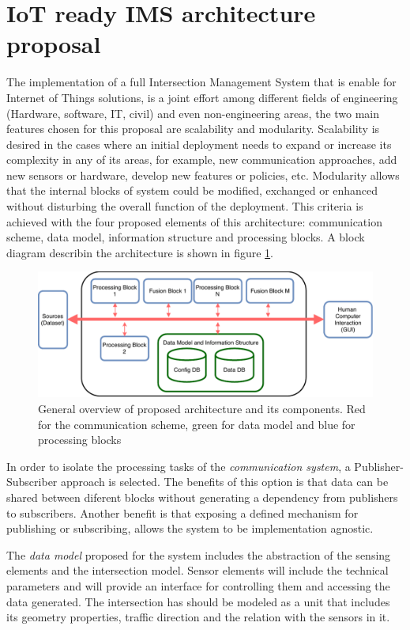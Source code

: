 \documentclass[conference]{IEEEtran}
\begin{document}
\section{IoT ready IMS architecture proposal}

The implementation of a full Intersection Management System that is enable for Internet of Things solutions, is a joint effort among different fields of engineering (Hardware, software, IT, civil) and even non-engineering areas, the two main features chosen for this proposal are scalability and modularity. Scalability is desired in the cases where an initial deployment needs to expand or increase its complexity in any of its areas, for example, new communication approaches, add new sensors or hardware, develop new features or policies, etc. Modularity allows that the internal blocks of system could be modified, exchanged or enhanced without disturbing the overall function of the deployment. This criteria is achieved with the four proposed elements of this architecture: communication scheme, data model, information structure and processing blocks. A block diagram describin the architecture is shown in figure \ref{proposal_blocks}.

\begin{figure}[ht!]
\centering
\includegraphics[scale=0.5]{../fig/3/proposal_blocks.pdf}
\caption{General overview of proposed architecture and its components. Red for the communication scheme, green for data model and blue for processing blocks}
\label{proposal_blocks}
\end{figure} 

In order to isolate the processing tasks of the \textit{communication system}, a Publisher-Subscriber approach is selected. The benefits of this option is that data can be shared between diferent blocks without generating a dependency from publishers to subscribers. Another benefit is that exposing a defined mechanism for publishing or subscribing, allows the system to be implementation agnostic.

The \textit{data model} proposed for the system includes the abstraction of the sensing elements and the intersection model. Sensor elements will include the technical parameters and will provide an interface for controlling them and accessing the data generated. The intersection has should be modeled as a unit that includes its geometry properties, traffic direction and the relation with the sensors in it.
\end{document}
